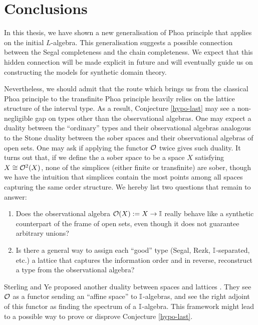 
\chapter{Conclusions}

In this thesis, we have shown a new generalisation of Phoa principle that applies on the initial $L$-algebra. This generalisation suggests a possible connection between the Segal completeness and the chain completeness. We expect that this hidden connection will be made explicit in future and will eventually guide us on constructing the models for synthetic domain theory.

Nevertheless, we should admit that the route which brings us from the classical Phoa principle to the transfinite Phoa principle heavily relies on the lattice structure of the interval type. As a result, Conjecture \ref{hypo-last} may see a non-negligible gap on types other than the observational algebras. One may expect a duality between the ``ordinary'' types and their observational algebras analogous to the Stone duality between the sober spaces and their observational algebras of open sets. One may ask if applying the functor $\mathcal{O}$ twice gives such duality. It turns out that, if we define the a sober space to be a space $X$ satisfying $X\cong\mathcal{O}^2(X)$, none of the simplices (either finite or transfinite) are sober, though we have the intuition that simplices contain the most points among all spaces capturing the same order structure. We hereby list two questions that remain to answer:
\begin{enumerate}
    \item Does the observational algebra $\mathcal{O}(X):=X\to\mathbb{I}$ really behave like a synthetic counterpart of the frame of open sets, even though it does not guarantee arbitrary unions?
    \item Is there a general way to assign each ``good'' type (Segal, Rezk, $\mathbb{I}$-separated, etc.) a lattice that captures the information order and in reverse, reconstruct a type from the observational algebra?
\end{enumerate}
Sterling and Ye proposed another duality between spaces and lattices \cite{sterling_domains_2025}. They see $\mathcal{O}$ as a functor sending an ``affine space'' to $\mathbb{I}$-algebras, and see the right adjoint of this functor as finding the spectrum of a $\mathbb{I}$-algebra. This framework might lead to a possible way to prove or disprove Conjecture \ref{hypo-last}.

